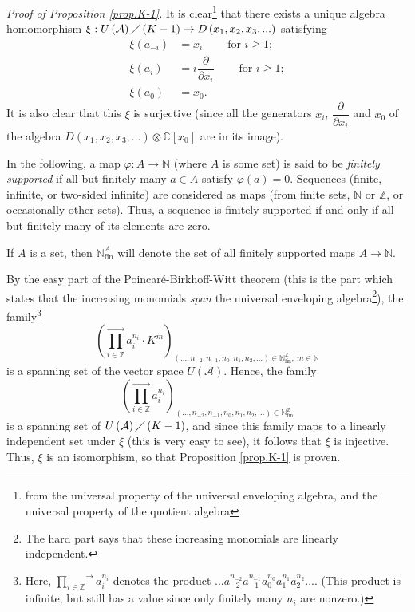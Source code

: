 \documentclass[etingof-lie.tex]{subfiles}
\begin{document}
\textit{Proof of Proposition \ref{prop.K-1}.} It is clear\footnote{from the
universal property of the universal enveloping algebra, and the universal
property of the quotient algebra} that there exists a unique algebra
homomorphism $\xi:U\left(  \mathcal{A}\right)  \diagup\left(  K-1\right)
\rightarrow D\left(  x_{1},x_{2},x_{3},...\right)  $ satisfying%
\begin{align*}
\xi\left(  a_{-i}\right)   &  =x_{i}\ \ \ \ \ \ \ \ \ \ \text{for }i\geq1;\\
\xi\left(  a_{i}\right)   &  =i\dfrac{\partial}{\partial x_{i}}%
\ \ \ \ \ \ \ \ \ \ \text{for }i\geq1;\\
\xi\left(  a_{0}\right)   &  =x_{0}.
\end{align*}
It is also clear that this $\xi$ is surjective (since all the generators
$x_{i}$, $\dfrac{\partial}{\partial x_{i}}$ and $x_{0}$ of the algebra
$D\left(  x_{1},x_{2},x_{3},...\right)  \otimes\mathbb{C}\left[  x_{0}\right]
$ are in its image).

In the following, a map $\varphi:A\rightarrow\mathbb{N}$ (where $A$ is some
set) is said to be \textit{finitely supported} if all but finitely many $a\in
A$ satisfy $\varphi\left(  a\right)  =0$. Sequences (finite, infinite, or
two-sided infinite) are considered as maps (from finite sets, $\mathbb{N}$ or
$\mathbb{Z}$, or occasionally other sets). Thus, a sequence is finitely
supported if and only if all but finitely many of its elements are zero.

If $A$ is a set, then $\mathbb{N}_{\operatorname*{fin}}^{A}$ will denote the
set of all finitely supported maps $A\rightarrow\mathbb{N}$.

By the easy part of the Poincar\'{e}-Birkhoff-Witt theorem (this is the part
which states that the increasing monomials \textit{span} the universal
enveloping algebra\footnote{The hard part says that these increasing monomials
are linearly independent.}), the family\footnote{Here, $\overset{\rightarrow
}{\prod\limits_{i\in\mathbb{Z}}}a_{i}^{n_{i}}$ denotes the product
$...a_{-2}^{n_{-2}}a_{-1}^{n_{-1}}a_{0}^{n_{0}}a_{1}^{n_{1}}a_{2}^{n_{2}}...$.
(This product is infinite, but still has a value since only finitely many
$n_{i}$ are nonzero.)}%
\[
\left(  \overset{\rightarrow}{\prod\limits_{i\in\mathbb{Z}}}a_{i}^{n_{i}}\cdot
K^{m}\right)  _{\left(  ...,n_{-2},n_{-1},n_{0},n_{1},n_{2},...\right)
\in\mathbb{N}_{\operatorname*{fin}}^{\mathbb{Z}},\ m\in\mathbb{N}}%
\]
is a spanning set of the vector space $U\left(  \mathcal{A}\right)  $. Hence,
the family
\[
\left(  \overset{\rightarrow}{\prod\limits_{i\in\mathbb{Z}}}a_{i}^{n_{i}%
}\right)  _{\left(  ...,n_{-2},n_{-1},n_{0},n_{1},n_{2},...\right)
\in\mathbb{N}_{\operatorname*{fin}}^{\mathbb{Z}}}%
\]
is a spanning set of $U\left(  \mathcal{A}\right)  \diagup\left(  K-1\right)
$, and since this family maps to a linearly independent set under $\xi$ (this
is very easy to see), it follows that $\xi$ is injective. Thus, $\xi$ is an
isomorphism, so that Proposition \ref{prop.K-1} is proven.
\end{document}
